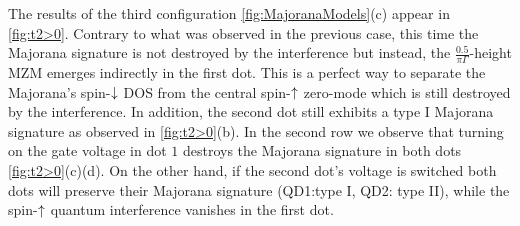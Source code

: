 The results of the third configuration \ref{fig:MajoranaModels}(c) appear in \ref{fig:t2>0}. Contrary to what was observed in the previous case, this time the Majorana signature is not destroyed by the interference but instead, the  $\frac{0.5}{\pi \Gamma}$-height MZM emerges indirectly in the first dot. This is a perfect way to separate the Majorana's spin-$\downarrow$ DOS from the central spin-$\uparrow$ zero-mode which is still destroyed by the interference. In addition, the second dot still exhibits a type I Majorana signature as observed in \ref{fig:t2>0}(b). In the second row we observe that turning on the gate voltage in dot $1$  destroys the Majorana signature in both dots \ref{fig:t2>0}(c)(d). On the other hand, if the second dot's voltage is switched both dots will preserve their Majorana signature (QD1:type I, QD2: type II), while the spin-$\uparrow$ quantum interference vanishes in the first dot.










    

